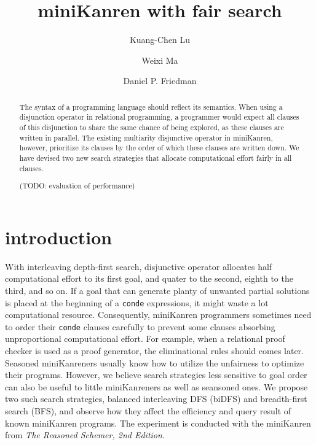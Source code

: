 \documentclass[format=acmlarge, review=true, authordraft=true]{acmart}
\title{miniKanren with fair search}
\author{Kuang-Chen Lu}
\affiliation{Indiana University}
\author{Weixi Ma}
\affiliation{Indiana University}
\author{Daniel P. Friedman}
\affiliation{Indiana University}
\begin{document}
\begin{abstract}

The syntax of a programming language should reflect its semantics. When using a
disjunction operator in relational programming, a programmer would expect all
clauses of this disjunction to share the same chance of being explored, as
these clauses are written in parallel. The existing multiarity disjunctive
operator in miniKanren, however, prioritize its clauses by the order of which
these clauses are written down. We have devised two new search strategies that
allocate computational effort fairly in all clauses.

(TODO: evaluation of performance)




\end{abstract}

\maketitle

\section{introduction}

With interleaving depth-first search, disjunctive operator allocates half
computational effort to its first goal, and quater to the second, eighth to the
third, and so on. If a goal that can generate planty of unwanted partial 
solutions is placed at the beginning of a \texttt{conde} expressions, it might
waste a lot computational resource. Consequently, miniKanren programmers 
sometimes need to order their \texttt{conde} clauses carefully to prevent some 
clauses absorbing unproportional computational effort. For example, when a 
relational proof checker is used as a proof generator, the eliminational rules 
should comes later.
Seasoned miniKanreners usually know how to utilize the unfairness to optimize
their programs. However, we believe search strategies less sensitive to goal
order can also be useful to little miniKanreners as well as seansoned ones. We 
propose two such search strategies, balanced interleaving DFS (biDFS) and
breadth-first search (BFS), and observe how they affect the efficiency and
query result of known miniKanren programs. The experiment is conducted with the
miniKanren from \textit{The Reasoned Schemer, 2nd Edition}.
\end{document}
